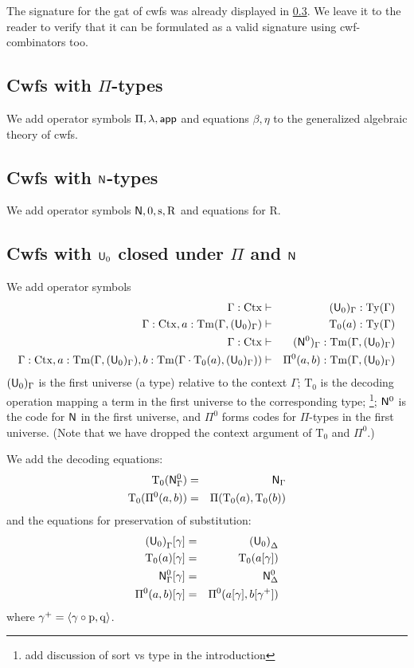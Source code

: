 \documentclass{lmcs}
\newcommand{\s}{\mathrm{s}}
\newcommand{\Rec}{\mathrm{R}}
\newcommand{\Ta}{\mathrm{T}}
\def\Ctx{\mathrm{Ctx}}
\begin{document}
The signature for the gat of cwfs was already displayed in \ref{}. We leave it to the reader to verify that it can be formulated as a valid signature using cwf-combinators too.

\subsection{Cwfs with $\Pi$-types} 
We add operator symbols $\Pi, \lambda, \mathsf{app}$ and equations $\beta, \eta$ to the generalized algebraic theory of cwfs. 

\subsection{Cwfs with $\mathsf{N}$-types} 
We add operator symbols $\N, 0, \s, \Rec$ and equations for $\Rec$.

\subsection{Cwfs with $\mathsf{U}_0$ closed under $\Pi$ and $\mathsf{N}$} 
We add operator symbols
\begin{eqnarray*}
\Gamma : \Ctx &\vdash& (\U_0)_\Gamma : \Ty(\Gamma)\\
\Gamma : \Ctx, a : \Tm(\Gamma,(\U_0)_\Gamma) &\vdash& {\Ta_0}(a) : \Ty(\Gamma)\\
\Gamma : \Ctx &\vdash& (\N^0)_\Gamma : \Tm(\Gamma,(\U_0)_\Gamma) \\
\Gamma : \Ctx, 
a : \Tm(\Gamma,(\U_0)_\Gamma), 
b :  \Tm(\Gamma \cdot \Ta_0(a), (\U_0)_\Gamma))
&\vdash&
 \Pi^0(a,b) : \Tm(\Gamma,(\U_0)_\Gamma)
\end{eqnarray*}
$(\mathsf{U}_0)_\Gamma$ is the first universe (a type) relative to the context $\Gamma$; $\Ta_0$ is the decoding operation mapping a term in the first universe to the corresponding type; \footnote{add discussion of sort vs type in the introduction}; $\mathsf{N}^0$ is the code for $\mathsf{N}$ in the first universe, and $\Pi^0$ forms codes for $\Pi$-types in the first universe. (Note that we have dropped the context argument of $\Ta_0$ and $\Pi^0$.)

We add the decoding equations:
\begin{eqnarray*}
\Ta_0(\N^0_\Gamma) &=& \N_\Gamma\\
\Ta_0(\Pi^0(a,b)) &=& \Pi(\Ta_0(a),\Ta_0(b))
\end{eqnarray*}
and the equations for preservation of substitution:
\begin{eqnarray*}
{(\U_0)}_\Gamma [ \gamma ] &=& {(\U_0)}_\Delta\\
\Ta_0(a) [ \gamma ] &=& \Ta_0(a[ \gamma ] )\\
\N^0_\Gamma [ \gamma ] &=&\N^0_\Delta\\
\Pi^0(a,b)[ \gamma ] &=& \Pi^0(a [ \gamma ], b[ \gamma^+ ])
\end{eqnarray*}
where $\gamma^+ = \langle \gamma \circ \mathrm{p}, \mathrm{q} \rangle$.
\end{document}
